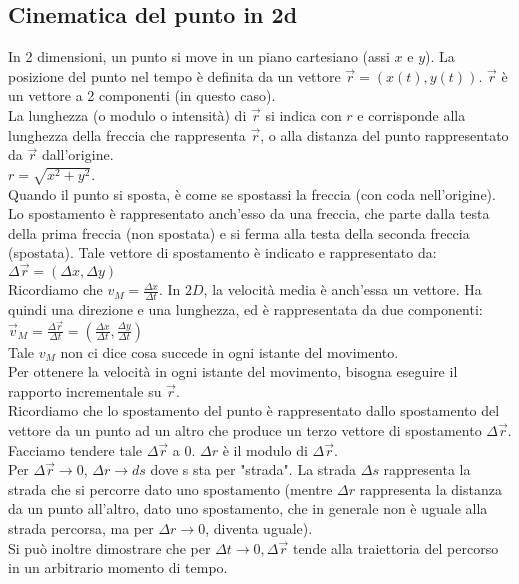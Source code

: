 \documentclass{article}
\begin{document}
\subsection*{Cinematica del punto in 2d}
In 2 dimensioni, un punto si move in un piano cartesiano (assi $x$ e $y$). La posizione
del punto nel tempo \`{e} definita da un vettore $\vec{r}=(x(t),y(t))$. $\vec{r}$ 
\`{e} un vettore a 2 componenti (in questo caso).\\
La lunghezza (o modulo o intensit\`{a}) di $\vec{r}$ si indica con $r$ e corrisponde
alla lunghezza della freccia che rappresenta $\vec{r}$, o alla distanza del punto rappresentato
da $\vec{r}$ dall'origine.\\
$r=\sqrt{x^2+y^2}$.\\
Quando il punto si sposta, \`{e} come se spostassi la freccia (con coda nell'origine).
Lo spostamento \`{e} rappresentato anch'esso da una freccia, che parte dalla testa
della prima freccia (non spostata) e si ferma alla testa della seconda freccia (spostata).
Tale vettore di spostamento \`{e} indicato e rappresentato da: $\Delta \vec{r}=(\Delta x,\Delta y)$\\
Ricordiamo che $v_M=\frac{\Delta x}{\Delta t}$. In $2D$, la velocit\`{a} media \`{e} anch'essa un vettore. Ha quindi
una direzione e una lunghezza, ed \`{e} rappresentata da due componenti: $\vec{v}_M=\frac{\Delta \vec{r}}{\Delta t}=(\frac{\Delta x}{\Delta t},\frac{\Delta y}{\Delta t})$\\
Tale $v_M$ non ci dice cosa succede in ogni istante del movimento.\\
Per ottenere la velocit\`{a} in ogni istante del movimento, bisogna eseguire il rapporto
incrementale su $\vec{r}$.\\
Ricordiamo che lo spostamento del punto \`{e} rappresentato dallo spostamento del vettore
da un punto ad un altro che produce un terzo vettore di spostamento $\Delta \vec{r}$.\\
Facciamo tendere tale $\Delta \vec{r}$ a 0. $\Delta r$ \`{e} il modulo di $\Delta \vec{r}$.\\
Per $\Delta \vec{r}\to 0$, $\Delta r\to ds$ dove s sta per "strada". La strada $\Delta s$ rappresenta 
la strada che si percorre dato uno spostamento (mentre $\Delta r$ rappresenta 
la distanza da un punto all'altro, dato uno spostamento, che in generale non \`{e}
uguale alla strada percorsa, ma per $\Delta r\to 0$, diventa uguale).\\
Si pu\`{o} inoltre dimostrare che per $\Delta t\to 0, \Delta \vec{r}$ tende alla
traiettoria del percorso in un arbitrario momento di tempo.\\
\end{document}
